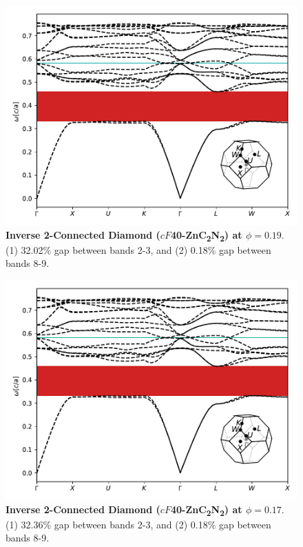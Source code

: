 \documentclass[fleqn,amsmath,amssymb,superscriptaddress, reprint,prl]{revtex4-1}
\begin{document}
\begin{figure}
\includegraphics[width=0.9\linewidth]{workspace/423bfdcaa1786308e99c4b91793cccd1/images/r=38.pdf}
	\caption{\textbf{Inverse 2-Connected Diamond ($cF$40-ZnC\textsubscript{2}N\textsubscript{2}) at $\phi=0.19$}. (1) 32.02\% gap between bands 2-3, and (2) 0.18\% gap between bands 8-9.}
\end{figure}

\begin{figure}
\includegraphics[width=0.9\linewidth]{workspace/423bfdcaa1786308e99c4b91793cccd1/images/r=39.pdf}
	\caption{\textbf{Inverse 2-Connected Diamond ($cF$40-ZnC\textsubscript{2}N\textsubscript{2}) at $\phi=0.17$}. (1) 32.36\% gap between bands 2-3, and (2) 0.18\% gap between bands 8-9.}
\end{figure}
\end{document}
